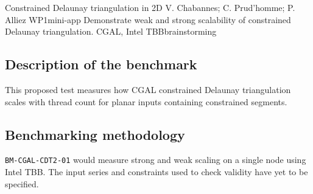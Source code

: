 {Constrained Delaunay triangulation in 2D}
{V. Chabannes; C. Prud'homme; P. Alliez}
{WP1}{mini-app}
{Demonstrate weak and strong scalability of constrained Delaunay triangulation.}
{CGAL, Intel TBB}{brainstorming}
\subsection{Description of the benchmark}
This proposed test measures how CGAL constrained Delaunay triangulation
scales with thread count for planar inputs containing constrained segments.

\subsection{Benchmarking methodology}
\texttt{BM-CGAL-CDT2-01} would measure strong and weak scaling on a
single node using Intel TBB. The input series and constraints used to
check validity have yet to be specified.
